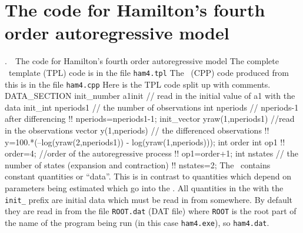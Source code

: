 \documentclass[12pt]{book}
\makeatletter
\def\mysection#1{\section{#1}{\bigbf \medbreak\noindent\number\c@chapter.\number\c@section\ \ #1\medbreak}}
\makeatother
\begin{document}
\mysection{The code for Hamilton's fourth order autoregressive model}
The complete \ADM\ template (TPL) code is in the file {\tt ham4.tpl}
The \cplus\  (CPP) code produced from this is in the file {\tt ham4.cpp}
Here is the TPL code split up with comments. 
\beginexample
DATA_SECTION
  init_number a1init   // read in the initial value of a1 with the data
  init_int nperiods1   // the number of observations
  int nperiods  // nperiods-1 after differencing
 !! nperiods=nperiods1-1;
  init_vector yraw(1,nperiods1)  //read in the observations
  vector y(1,nperiods)   // the differenced observations
 !! y=100.*(--log(yraw(2,nperiods1)) - log(yraw(1,nperiods))); 
  int order 
  int op1  
 !! order=4; //order of the autoregressive process
 !! op1=order+1;
  int nstates  // the number of states (expansion and contraction)
 !! nstates=2;
\endexample
The \DS\ contains constant quantities or ``data''. This is in contrast
to quantities which depend on parameters being estimated which go into the
\PS. All quantities in the \PS 
with the {\tt init\_} prefix are initial data
which must be read in from somewhere. By default they are read in from the
file {\tt ROOT.dat} (DAT file) where {\tt ROOT} is the root part of the name 
of the program being run (in this case {\tt ham4.exe}), so {\tt ham4.dat}.
\end{document}
